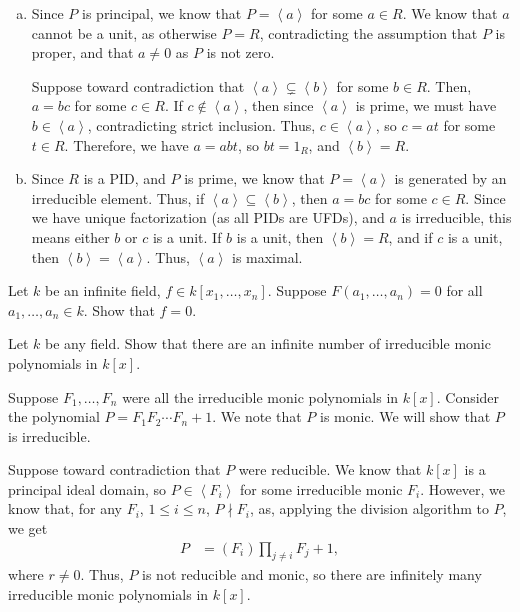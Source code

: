 \documentclass[10pt]{mypackage}
\begin{document}
\begin{solution}\hfill
  \begin{enumerate}[(a)]
    \item Since $P$ is principal, we know that $ P = \left\langle a \right\rangle $ for some $a\in R$. We know that $a$ cannot be a unit, as otherwise $P = R$, contradicting the assumption that $P$ is proper, and that $a\neq 0$ as $P$ is not zero.\newline

      Suppose toward contradiction that $\left\langle a \right\rangle\subsetneq \left\langle b \right\rangle$ for some $b\in R$. Then, $a = bc$ for some $c\in R$. If $c\notin \left\langle a \right\rangle$, then since $\left\langle a \right\rangle$ is prime, we must have $b\in \left\langle a \right\rangle$, contradicting strict inclusion. Thus, $c\in \left\langle a \right\rangle$, so $c = at$ for some $t\in R$. Therefore, we have $a = abt$, so $bt = 1_R$, and $\left\langle b \right\rangle = R$.
    \item Since $R$ is a PID, and $P$ is prime, we know that $P = \left\langle a \right\rangle$ is generated by an irreducible element. Thus, if $\left\langle a \right\rangle\subseteq \left\langle b \right\rangle$, then $a = bc$ for some $c\in R$. Since we have unique factorization (as all PIDs are UFDs), and $a$ is irreducible, this means either $b$ or $c$ is a unit. If $b$ is a unit, then $\left\langle b  \right\rangle = R$, and if $c$ is a unit, then $\left\langle b \right\rangle = \left\langle a \right\rangle$. Thus, $\left\langle a \right\rangle$ is maximal.
  \end{enumerate}
\end{solution}
\begin{exercise}[Exercise 1.4]
Let $k$ be an infinite field, $f\in k\left[x_1,\dots,x_n\right]$. Suppose $F\left(a_1,\dots,a_n\right) = 0$ for all $a_1,\dots,a_n\in k$. Show that $f = 0$.
\end{exercise}
\begin{exercise}[Exercise 1.5]
Let $k$ be any field. Show that there are an infinite number of irreducible monic polynomials in $k\left[x\right]$.
\end{exercise}
\begin{solution}
  Suppose $F_1,\dots,F_n$ were all the irreducible monic polynomials in $k\left[x\right]$. Consider the polynomial $P = F_1F_2\cdots F_n + 1$. We note that $P$ is monic. We will show that $P$ is irreducible.\newline

  Suppose toward contradiction that $P$ were reducible. We know that $k\left[x\right]$ is a principal ideal domain, so $P\in \left\langle F_i \right\rangle$ for some irreducible monic $F_i$. However, we know that, for any $F_i$, $1\leq i\leq n$, $P \nmid F_i$, as, applying the division algorithm to $P$, we get
  \begin{align*}
    P &= \left(F_i\right)\prod_{j\neq i}F_j + 1,
  \end{align*}
  where $r \neq 0$. Thus, $P$ is not reducible and monic, so there are infinitely many irreducible monic polynomials in $k\left[x\right]$.
\end{solution}
\end{document}
